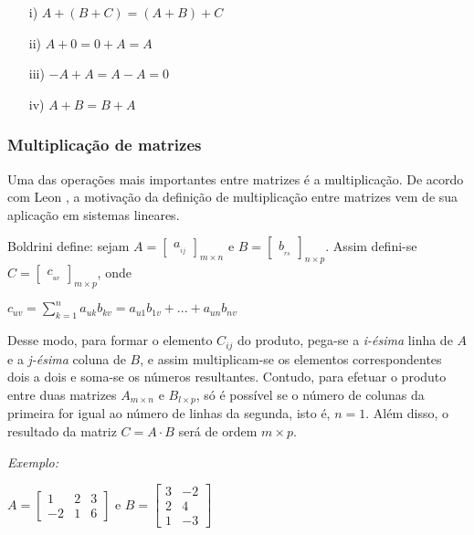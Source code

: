 \begin{enumerate}
    \item[i)] $A + (B + C) = (A + B) + C$
    \item[ii)] $A + 0 = 0 + A = A$
    \item[iii)] $-A + A = A - A = 0$
    \item[iv)] $A + B = B + A$
\end{enumerate}

\subsubsection{Multiplicação de matrizes}
\noindent Uma das operações mais importantes entre matrizes é a multiplicação. De acordo com Leon \cite{1998:Leon}, a motivação da definição de multiplicação entre matrizes vem de sua aplicação em sistemas lineares.

Boldrini \cite{1980:Boldrini} define: sejam $A = \begin{bmatrix} a_{}_{ij} \end{bmatrix}_{m \times n}$ e $B = \begin{bmatrix} b_{}_{rs}\end{bmatrix}_{n \times p}$. Assim defini-se $C = \begin{bmatrix} c_{}_{uv} \end{bmatrix}_{m \times p}$, onde

\begin{center}
    $c_{uv} = \sum_{k = 1}^{n} a_{uk}b_{kv} = a_{u1}b_{1v} + ... + a_{un}b_{nv}$
\end{center}

Desse modo, para formar o elemento $C_{ij}$ do produto, pega-se a \textit{i-ésima} linha de $A$ e a \textit{j-ésima} coluna de $B$, e assim multiplicam-se os elementos correspondentes dois a dois e soma-se os números resultantes. Contudo, para efetuar o produto entre duas matrizes $A_{m \times n}$ e $B_{l \times p}$, só é possível se o número de colunas da primeira for igual ao número de linhas da segunda, isto é, $n = 1$. Além disso, o resultado da matriz $C = A\cdot B$ será de ordem $m \times p$.

\textit{Exemplo:}
\begin{center}
    $A = 
    \begin{bmatrix}
        1 & 2 & 3 \\ 
        -2 & 1 & 6 
    \end{bmatrix}$
    e $B = 
    \begin{bmatrix}
        3 & -2 \\ 
        2 & 4 \\
        1 & -3 
    \end{bmatrix}$
\end{center}

